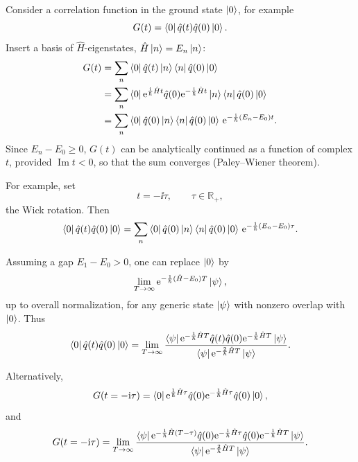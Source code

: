 Consider a correlation function in the ground state $\ket{0}$, for example
\[
  G(t)=\bra{0}\hat q(t)\hat q(0)\ket{0}.
\]
Insert a basis of $\hat H$-eigenstates, $\hat H\ket{n}=E_n\ket{n}$:
\[
\begin{aligned}
  G(t)
  &=
  \sum_n
  \bra{0}\hat q(t)\ket{n}\bra{n}\hat q(0)\ket{0}
  \\
  &=
  \sum_n
  \bra{0}
  \mathrm{e}^{\frac{\mathrm{i}}{\hbar}\hat Ht}
  \hat q(0)
  \mathrm{e}^{-\frac{\mathrm{i}}{\hbar}\hat Ht}
  \ket{n}
  \bra{n}\hat q(0)\ket{0}
  \\
  &=
  \sum_n
  \bra{0}\hat q(0)\ket{n}
  \bra{n}\hat q(0)\ket{0}\,
  \mathrm{e}^{-\frac{\mathrm{i}}{\hbar}(E_n-E_0)t}.
\end{aligned}
\]
Since $E_n-E_0\ge 0$, $G(t)$ can be analytically continued as a function of
complex $t$, provided $\operatorname{Im}t<0$, so that the sum converges
(Paley--Wiener theorem).

For example, set
\[
  t=-\ii\tau,
  \qquad
  \tau\in\mathbb R_+,
\]
the Wick rotation. Then
\[
  \bra{0}\hat q(t)\hat q(0)\ket{0}
  =
  \sum_n
  \bra{0}\hat q(0)\ket{n}
  \bra{n}\hat q(0)\ket{0}\,
  \mathrm{e}^{-\frac{1}{\hbar}(E_n-E_0)\tau}.
\]

Assuming a gap $E_1-E_0>0$, one can replace $\ket{0}$ by
\[
  \lim_{T\to\infty}
  \mathrm{e}^{-\frac{1}{\hbar}(\hat H-E_0)T}\ket{\psi},
\]
up to overall normalization, for any generic state $\ket{\psi}$ with nonzero
overlap with $\ket{0}$. Thus
\[
  \bra{0}\hat q(t)\hat q(0)\ket{0}
  =
  \lim_{T\to\infty}
  \frac{
  \bra{\psi}
  \mathrm{e}^{-\frac{1}{\hbar}\hat H T}
  \hat q(t)\hat q(0)
  \mathrm{e}^{-\frac{1}{\hbar}\hat H T}
  \ket{\psi}
  }{
  \bra{\psi}\mathrm{e}^{-\frac{2}{\hbar}\hat H T}\ket{\psi}
  }.
\]

\begin{center}
\end{center}

Alternatively,
\[
  G(t=-\mathrm{i}\tau)
  =
  \bra{0}
  \mathrm{e}^{\frac{1}{\hbar}\hat H\tau}
  \hat q(0)
  \mathrm{e}^{-\frac{1}{\hbar}\hat H\tau}
  \hat q(0)
  \ket{0},
\]
and
\[
  G(t=-\mathrm{i}\tau)
  =
  \lim_{T\to\infty}
  \frac{
  \bra{\psi}
  \mathrm{e}^{-\frac{1}{\hbar}\hat H(T-\tau)}
  \hat q(0)
  \mathrm{e}^{-\frac{1}{\hbar}\hat H\tau}
  \hat q(0)
  \mathrm{e}^{-\frac{1}{\hbar}\hat H T}
  \ket{\psi}
  }{
  \bra{\psi}\mathrm{e}^{-\frac{2}{\hbar}\hat H T}\ket{\psi}
  }.
\]

